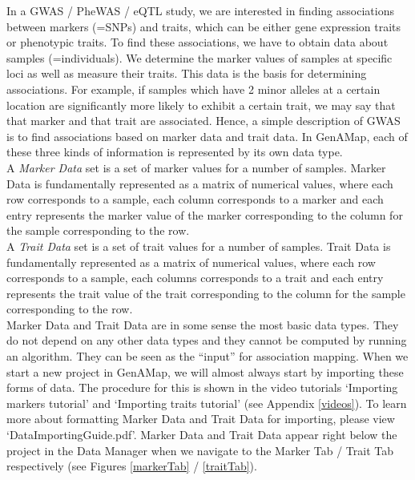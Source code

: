 \documentclass{article}
\begin{document}
In a GWAS / PheWAS / eQTL study, we are interested in finding associations between markers (=SNPs) and traits, which can be either gene expression traits or phenotypic traits. To find these associations, we have to obtain data about samples (=individuals). We determine the marker values of samples at specific loci as well as measure their traits. This data is the basis for determining associations. For example, if samples which have 2 minor alleles at a certain location are significantly more likely to exhibit a certain trait, we may say that that marker and that trait are associated. Hence, a simple description of GWAS is to find associations based on marker data and trait data. In GenAMap, each of these three kinds of information is represented by its own data type.\\

A {\it Marker Data} set is a set of marker values for a number of samples. Marker Data is fundamentally represented as a matrix of numerical values, where each row corresponds to a sample, each column corresponds to a marker and each entry represents the marker value of the marker corresponding to the column for the sample corresponding to the row.\\

A {\it Trait Data} set is a set of trait values for a number of samples. Trait Data is fundamentally represented as a matrix of numerical values, where each row corresponds to a sample, each columns corresponds to a trait and each entry represents the trait value of the trait corresponding to the column for the sample corresponding to the row.\\

Marker Data and Trait Data are in some sense the most basic data types. They do not depend on any other data types and they cannot be computed by running an algorithm. They can be seen as the ``input'' for association mapping. When we start a new project in GenAMap, we will almost always start by importing these forms of data. The procedure for this is shown in the video tutorials `Importing markers tutorial' and `Importing traits tutorial' (see Appendix \ref{videos}). To learn more about formatting Marker Data and Trait Data for importing, please view `DataImportingGuide.pdf'. Marker Data and Trait Data appear right below the project in the Data Manager when we navigate to the Marker Tab / Trait Tab respectively (see Figures \ref{markerTab} / \ref{traitTab}). \\
\end{document}
